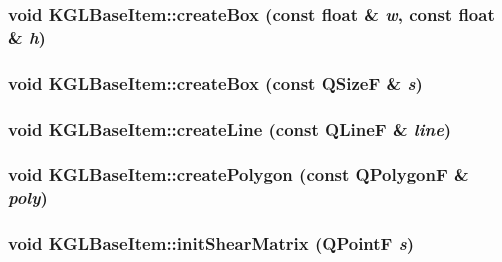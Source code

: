 \hypertarget{class_k_g_l_base_item_092dd2a3401a1192fecbf63c8a486777}{
\subsubsection[{createBox}]{\setlength{\rightskip}{0pt plus 5cm}void KGLBaseItem::createBox (const float \& {\em w}, \/  const float \& {\em h})}}
\label{class_k_g_l_base_item_092dd2a3401a1192fecbf63c8a486777}


\hypertarget{class_k_g_l_base_item_180099829489993a95ec445a46ac49d3}{
\subsubsection[{createBox}]{\setlength{\rightskip}{0pt plus 5cm}void KGLBaseItem::createBox (const QSizeF \& {\em s})}}
\label{class_k_g_l_base_item_180099829489993a95ec445a46ac49d3}


\hypertarget{class_k_g_l_base_item_810379a4aac12d9061b14b2aa3e55ea6}{
\subsubsection[{createLine}]{\setlength{\rightskip}{0pt plus 5cm}void KGLBaseItem::createLine (const QLineF \& {\em line})}}
\label{class_k_g_l_base_item_810379a4aac12d9061b14b2aa3e55ea6}


\hypertarget{class_k_g_l_base_item_849ec6bf857c964042b8c2f1305fd5b1}{
\subsubsection[{createPolygon}]{\setlength{\rightskip}{0pt plus 5cm}void KGLBaseItem::createPolygon (const QPolygonF \& {\em poly})}}
\label{class_k_g_l_base_item_849ec6bf857c964042b8c2f1305fd5b1}


\hypertarget{class_k_g_l_base_item_628f1737fb9ec96f4296798f86a2fcdb}{
\subsubsection[{initShearMatrix}]{\setlength{\rightskip}{0pt plus 5cm}void KGLBaseItem::initShearMatrix (QPointF {\em s})}}
\label{class_k_g_l_base_item_628f1737fb9ec96f4296798f86a2fcdb}


